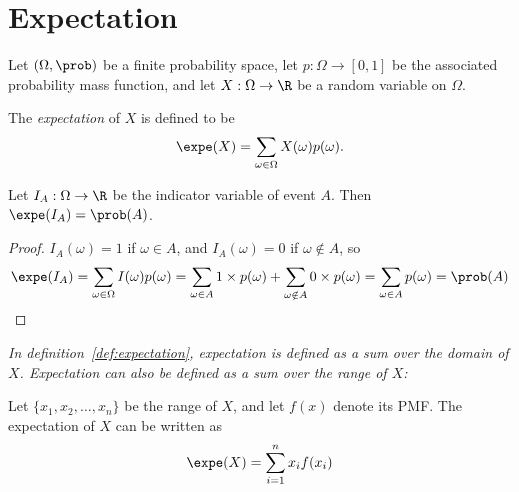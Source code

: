 \section{Expectation}
Let $(\Omega,\prob)$ be a finite probability space, let $p:\Omega\to[0,1]$ be the associated probability mass function, and let $X:\Omega\to\R$ be a random variable on $\Omega$. 

\begin{definition}\label{def:expectation}
The \emph{expectation} of $X$ is defined to be
\[
\expe(X) = \sum_{\omega\in\Omega} X(\omega)p(\omega).
\]
\end{definition}

\begin{theorem}
Let $I_A:\Omega\to\R$ be the indicator variable of event $A$. Then $\expe(I_A) = \prob(A)$.
\end{theorem}

\begin{proof}
$I_A(\omega)=1$ if $\omega\in A$, and $I_A(\omega)=0$ if $\omega\notin A$, so
\[
\expe(I_A) 
	= \sum_{\omega\in\Omega} I(\omega)p(\omega) 
	= \sum_{\omega\in A} 1\times p(\omega) + \sum_{\omega\notin A} 0\times p(\omega) 
	= \sum_{\omega\in A} p(\omega) 
	= \prob(A)
\]
\end{proof}


\bit
\it In definition~\ref{def:expectation}, expectation is defined as a sum over the \emph{domain} of $X$.
\it Expectation can also be defined as a sum over the \emph{range} of $X$:
\eit

\begin{theorem}\label{thm:expe_pmf}
Let $\{x_1,x_2,\ldots,x_n\}$ be the range of $X$, and let $f(x)$ denote its PMF. The expectation of $X$ can be written as 
\[
\expe(X) = \sum_{i=1}^n x_i f(x_i) 
\]
\end{theorem}

